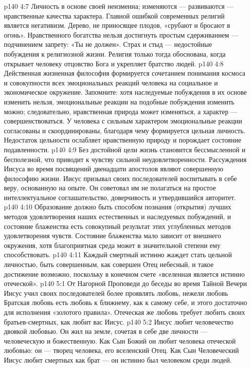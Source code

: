 \vs p140 4:7 \pc {} Личность в основе своей неизменна; изменяются --- развиваются --- нравственные качества характера. Главной ошибкой современных религий является негативизм. Дерево, не приносящее плодов, «срубают и бросают в огонь». Нравственного богатства нельзя достигнуть простым сдерживанием --- подчинением запрету: «Ты не должен». Страх и стыд --- недостойные побуждения к религиозной жизни. Религия только тогда обоснована, когда открывает человеку отцовство Бога и укрепляет братство людей.
\vs p140 4:8 \pc Действенная жизненная философия формируется сочетанием понимания космоса и совокупности всех эмоциональных реакций человека на социальное и экономическое окружение. Запомните: хотя наследуемые побуждения в их основе изменить нельзя, эмоциональные реакции на подобные побуждения изменить можно; следовательно, нравственная природа может изменяться, а характер --- совершенствоваться. У человека с сильным характером эмоциональные реакции согласованы и скоординированы, благодаря чему формируется цельная личность. Недостаток цельности ослабляет нравственную природу и порождает состояние подавленности.
\vs p140 4:9 Без достойной цели жизнь становится бессмысленной и бесполезной, что приводит к чувству сильной неудовлетворенности. Рассуждения Иисуса во время посвящений двенадцати апостолов являют совершенную философию жизни. Иисус призывал своих последователей воспитывать в себе веру, основанную на опыте. Он советовал им не полагаться на простое интеллектуальное соглашательство, доверчивость и утвердившийся авторитет.
\vs p140 4:10 Образование должно быть способом познания (открытия) лучших методов удовлетворения наших естественных и наследуемых побуждений, и состояние блаженства есть совокупный результат этих углубленных методов удовлетворения чувств. Состояние блаженства мало зависит от внешнего окружения, хотя благоприятная среда может в значительной степени ему способствовать.
\vs p140 4:11 \pc Каждый смертный истинно жаждет стать цельной личностью, быть совершенным, как совершен Отец небесный, и такое достижение возможно, поскольку в конечном счете «вселенная является истинно отеческой».
\vs p140 5:1 От Нагорной Проповеди до беседы во время Тайной Вечери Иисус учил своих последователей более проявлять  любовь, нежели любовь  Братская любовь есть любовь к ближнему, как к самому себе, и этого достаточно для исполнения «золотого правила». Отеческая же любовь требует любить своих братьев\hyp{}смертных, как любит вас Иисус.
\vs p140 5:2 Иисус любит человечество двоякой любовью. Он жил на земле, сочетая в себе две личности --- человеческую и божественную. Как Сын Божий он любит человека отеческой любовью: он --- творец человека, его вселенский Отец. Как Сын Человеческий Иисус любит смертных как брат --- он истинно был человеком среди людей.
